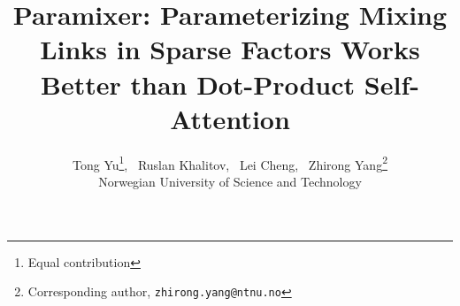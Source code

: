 \documentclass{article}
\title{Paramixer: Parameterizing Mixing Links in Sparse Factors Works Better than Dot-Product Self-Attention}
\date{}
\author{ Tong Yu\thanks{Equal contribution}, \  Ruslan Khalitov\samethanks, \  Lei Cheng, \ Zhirong Yang\thanks{Corresponding author, \texttt{zhirong.yang@ntnu.no}}\\
Norwegian University of Science and Technology}
\begin{document}
	\maketitle

\newcommand{\matA}{\mathbf{A}}
\newcommand{\matB}{\mathbf{B}}
\newcommand{\matC}{\mathbf{C}}
\newcommand{\matD}{\mathbf{D}}
\newcommand{\matE}{\mathbf{E}}
\newcommand{\matF}{\mathbf{F}}
\newcommand{\matG}{\mathbf{G}}
\newcommand{\matH}{\mathbf{H}}
\newcommand{\matI}{\mathbf{I}}
\newcommand{\matK}{\mathbf{K}}
\newcommand{\matL}{\mathbf{L}}
\newcommand{\matM}{\mathbf{M}}
\newcommand{\matN}{\mathbf{N}}
\newcommand{\matO}{\mathbf{O}}
\newcommand{\matP}{\mathbf{P}}
\newcommand{\matQ}{\mathbf{Q}}
\newcommand{\matR}{\mathbf{R}}
\newcommand{\matS}{\mathbf{S}}
\newcommand{\matT}{\mathbf{T}}
\newcommand{\matU}{\mathbf{U}}
\newcommand{\matV}{\mathbf{V}}
\newcommand{\matW}{\mathbf{W}}
\newcommand{\matX}{\mathbf{X}}
\newcommand{\matY}{\mathbf{Y}}
\newcommand{\matZ}{\mathbf{Z}}
\newcommand{\matg}{\mathbf{g}}

\newcommand{\calA}{\mathcal{A}}
\newcommand{\calB}{\mathcal{B}}
\newcommand{\calC}{\mathcal{C}}
\newcommand{\calD}{\mathcal{D}}
\newcommand{\calE}{\mathcal{E}}
\newcommand{\calF}{\mathcal{F}}
\newcommand{\calG}{\mathcal{G}}
\newcommand{\calH}{\mathcal{H}}
\newcommand{\calI}{\mathcal{I}}
\newcommand{\calJ}{\mathcal{J}}
\newcommand{\calK}{\mathcal{K}}
\newcommand{\calL}{\mathcal{L}}
\newcommand{\calM}{\mathcal{M}}
\newcommand{\calN}{\mathcal{N}}
\newcommand{\calO}{\mathcal{O}}
\newcommand{\calP}{\mathcal{P}}
\newcommand{\calQ}{\mathcal{Q}}
\newcommand{\calR}{\mathcal{R}}
\newcommand{\calS}{\mathcal{S}}
\newcommand{\calT}{\mathcal{T}}
\newcommand{\calU}{\mathcal{U}}
\newcommand{\calV}{\mathcal{V}}
\newcommand{\calW}{\mathcal{W}}
\newcommand{\calX}{\mathcal{X}}
\newcommand{\calY}{\mathcal{Y}}
\newcommand{\calZ}{\mathcal{Z}}



\newcommand{\bbA}{\mathbb{A}}
\newcommand{\bbB}{\mathbb{B}}
\newcommand{\bbR}{\mathbb{R}}
\newcommand{\bbZ}{\mathbb{Z}}
\newcommand{\bbE}{\mathbb{E}}
\newcommand{\bbH}{\mathbb{H}}

\newcommand{\veca}{\mathbf{a}}
\newcommand{\vecb}{\mathbf{b}}
\newcommand{\vecc}{\mathbf{c}}
\newcommand{\vecd}{\mathbf{d}}
\newcommand{\vece}{\mathbf{e}}
\newcommand{\vecf}{\mathbf{f}}
\newcommand{\vecg}{\mathbf{g}}
\newcommand{\vech}{\mathbf{h}}
\newcommand{\veci}{\mathbf{i}}
\newcommand{\vecj}{\mathbf{j}}
\newcommand{\veck}{\mathbf{k}}
\newcommand{\vecl}{\mathbf{l}}
\newcommand{\vecm}{\mathbf{m}}
\newcommand{\vecn}{\mathbf{n}}
\newcommand{\veco}{\mathbf{o}}
\newcommand{\vecp}{\mathbf{p}}
\newcommand{\vecq}{\mathbf{q}}
\newcommand{\vecr}{\mathbf{r}}
\newcommand{\vecs}{\mathbf{s}}
\newcommand{\vect}{\mathbf{t}}
\newcommand{\vecu}{\mathbf{u}}
\newcommand{\vecv}{\mathbf{v}}
\newcommand{\vecw}{\mathbf{w}}
\newcommand{\vecx}{\mathbf{x}}
\newcommand{\vecy}{\mathbf{y}}
\newcommand{\vecz}{\mathbf{z}}
\end{document}

